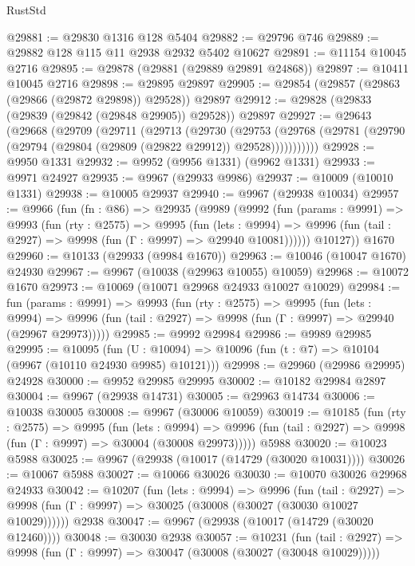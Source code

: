 \begin{lexlean}{RustStd}
\begin{coremodule}
@29881 := @29830 @1316 @128 @5404
@29882 := @29796 @746
@29889 := @29882 @128 @115 @11 @2938 @2932 @5402 @10627
@29891 := @11154 @10045 @2716
@29895 := @29878 (@29881 (@29889 @29891 @24868))
@29897 := @10411 @10045 @2716
@29898 := @29895 @29897
@29905 := @29854 (@29857 (@29863 (@29866 (@29872 @29898)) @29528)) @29897
@29912 := @29828 (@29833 (@29839 (@29842 (@29848 @29905)) @29528)) @29897
@29927 := @29643
    (@29668
      (@29709
        (@29711
          (@29713
            (@29730
              (@29753
                (@29768 (@29781 (@29790 (@29794 (@29804 (@29809 (@29822 @29912)) @29528)))))))))))
@29928 := @9950 @1331
@29932 := @9952 (@9956 @1331) (@9962 @1331)
@29933 := @9971 @24927
@29935 := @9967 (@29933 @9986)
@29937 := @10009 (@10010 @1331)
@29938 := @10005 @29937
@29940 := @9967 (@29938 @10034)
@29957 := @9966
    (fun (fn : @86) =>
    @29935
      (@9989
        (@9992
          (fun (params : @9991) =>
          @9993
            (fun (rty : @2575) =>
            @9995
              (fun (lets : @9994) =>
              @9996 (fun (tail : @2927) => @9998 (fun (Γ : @9997) => @29940 @10081))))))
        @10127))
    @1670
@29960 := @10133 (@29933 (@9984 @1670))
@29963 := @10046 (@10047 @1670) @24930
@29967 := @9967 (@10038 (@29963 @10055) @10059)
@29968 := @10072 @1670
@29973 := @10069 (@10071 @29968 @24933 @10027 @10029)
@29984 := fun (params : @9991) =>
  @9993
    (fun (rty : @2575) =>
    @9995
      (fun (lets : @9994) =>
      @9996 (fun (tail : @2927) => @9998 (fun (Γ : @9997) => @29940 (@29967 @29973)))))
@29985 := @9992 @29984
@29986 := @9989 @29985
@29995 := @10095
    (fun (U : @10094) => @10096 (fun (t : @7) => @10104 (@9967 (@10110 @24930 @9985) @10121)))
@29998 := @29960 (@29986 @29995) @24928
@30000 := @9952 @29985 @29995
@30002 := @10182 @29984 @2897
@30004 := @9967 (@29938 @14731)
@30005 := @29963 @14734
@30006 := @10038 @30005
@30008 := @9967 (@30006 @10059)
@30019 := @10185
    (fun (rty : @2575) =>
    @9995
      (fun (lets : @9994) =>
      @9996 (fun (tail : @2927) => @9998 (fun (Γ : @9997) => @30004 (@30008 @29973)))))
    @5988
@30020 := @10023 @5988
@30025 := @9967 (@29938 (@10017 (@14729 (@30020 @10031))))
@30026 := @10067 @5988
@30027 := @10066 @30026
@30030 := @10070 @30026 @29968 @24933
@30042 := @10207
    (fun (lets : @9994) =>
    @9996
      (fun (tail : @2927) =>
      @9998 (fun (Γ : @9997) => @30025 (@30008 (@30027 (@30030 @10027 @10029))))))
    @2938
@30047 := @9967 (@29938 (@10017 (@14729 (@30020 @12460))))
@30048 := @30030 @2938
@30057 := @10231
    (fun (tail : @2927) => @9998 (fun (Γ : @9997) => @30047 (@30008 (@30027 (@30048 @10029)))))

\end{coremodule}
\end{lexlean}
